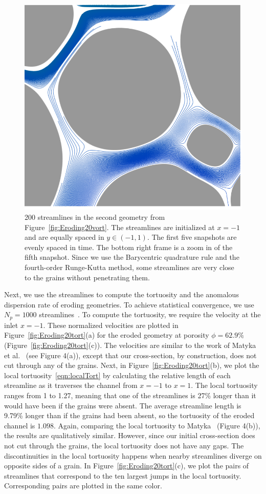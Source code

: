 \documentclass[preprint,10pt]{elsarticle}
\begin{document}
\begin{figure}[H]
\begin{center}
\includegraphics[width = 0.32 \textwidth]{./figs/tracer_20b270_zoom}
\caption{\label{fig:Eroding20tracer} 200 streamlines in the second
geometry from Figure~\ref{fig:Eroding20vort}. The streamlines are
initialized at $x=-1$ and are equally spaced in $y \in (-1,1)$. The
first five snapshots are evenly spaced in time.  The bottom right frame
is a zoom in of the fifth snapshot.  Since we use the Barycentric
quadrature rule and the fourth-order Runge-Kutta method, some
streamlines are very close to the grains without penetrating them.}
\end{center}
\end{figure}

Next, we use the streamlines to compute the tortuosity and the anomalous
dispersion rate of eroding geometries.  To achieve statistical
convergence, we use $N_p = 1000$ streamlines~\cite{bel-sal-rin1992}. To
compute the tortuosity, we require the velocity at the inlet $x=-1$.
These normalized velocities are plotted in
Figure~\ref{fig:Eroding20tort}(a) for the eroded geometry at porosity
$\phi = 62.9\%$ (Figure~\ref{fig:Eroding20tort}(c)).  The velocities are
similar to the work of Matyka et al.~\cite{mat-kha-koz2008} (see Figure
4(a)), except that our cross-section, by construction, does not cut
through any of the grains.  Next, in Figure~\ref{fig:Eroding20tort}(b),
we plot the local tortuosity~\eqref{eqn:localTort} by calculating the
relative length of each streamline as it traverses the channel from
$x=-1$ to $x=1$.  The local tortuosity ranges from 1 to 1.27, meaning
that one of the streamlines is 27\% longer than it would have been if
the grains were absent.  The average streamline length is 9.79\% longer
than if the grains had been absent, so the tortuosity of the eroded
channel is $1.098$.  Again, comparing the local tortuosity to
Matyka~\cite{mat-kha-koz2008} (Figure 4(b)), the results are
qualitatively similar. However, since our initial cross-section does not
cut through the grains, the local tortuosity does not have any gaps.
The discontinuities in the local tortuosity happens when nearby
streamlines diverge on opposite sides of a grain.  In
Figure~\ref{fig:Eroding20tort}(c), we plot the pairs of streamlines that
correspond to the ten largest jumps in the local tortuosity.
Corresponding pairs are plotted in the same color.
\end{document}
